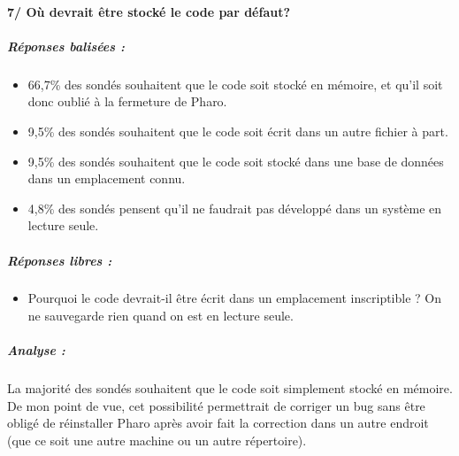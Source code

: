 \paragraph{7/ Où devrait être stocké le code par défaut?}
\subparagraph{Réponses balisées :}
\begin{itemize}
	\item 66,7\% des sondés souhaitent que le code soit stocké en mémoire, et qu'il soit donc oublié à la fermeture de Pharo.
	\item 9,5\% des sondés souhaitent que le code soit écrit dans un autre fichier à part.
	\item 9,5\% des sondés souhaitent que le code soit stocké dans une base de données dans un emplacement connu.
	\item 4,8\% des sondés pensent qu'il ne faudrait pas développé dans un système en lecture seule.
\end{itemize}

\subparagraph{Réponses libres :}
\begin{itemize}
	\item Pourquoi le code devrait-il être écrit dans un emplacement inscriptible ? On ne sauvegarde rien quand on est en lecture seule.
\end{itemize}

\subparagraph{Analyse :}
La majorité des sondés souhaitent que le code soit simplement stocké en mémoire. De mon point de vue, cet possibilité permettrait de corriger un bug sans être obligé de réinstaller Pharo après avoir fait la correction dans un autre endroit (que ce soit une autre machine ou un autre répertoire).